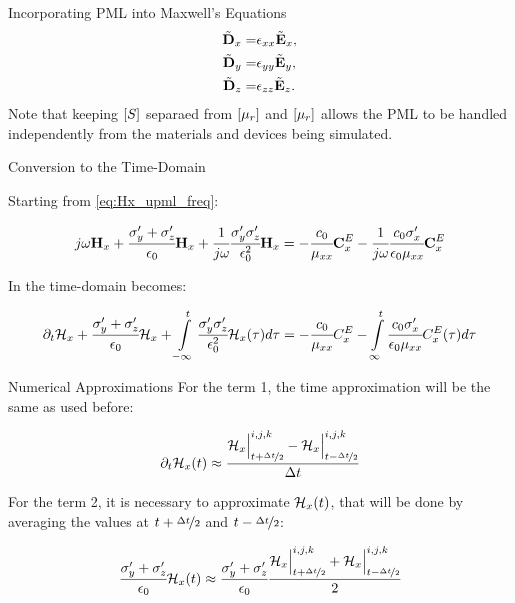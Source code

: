 \documentclass[aspectratio=169]{beamer}
\begin{document}
\begin{frame}{Incorporating PML into Maxwell's Equations}
  \begin{align}
    \tilde{\textbf{D}}_x =& \epsilon_{xx} \tilde{\textbf{E}}_x, \\
    \tilde{\textbf{D}}_y =& \epsilon_{yy} \tilde{\textbf{E}}_y, \\
    \tilde{\textbf{D}}_z =& \epsilon_{zz} \tilde{\textbf{E}}_z. 
  \end{align}
  Note that keeping $\brackets{S}$ separaed from $\brackets{\mu_r}$ and $\brackets{\mu_r}$ allows the PML to be handled independently from the materials and devices being simulated.
\end{frame}


\begin{frame}{Conversion to the Time-Domain}

  
  Starting from \eqref{eq:Hx_upml_freq}:


  \begin{align}
    j\omega \textbf{H}_x + \cfrac{\sigma_y^{\prime} + \sigma_z^{\prime}}{\epsilon_0}\textbf{H}_x + \cfrac{1}{j\omega}\cfrac{\sigma_y^{\prime}\sigma_z^{\prime}}{\epsilon_0^2}\textbf{H}_x
    = -\cfrac{c_0}{\mu_{xx}}\textbf{C}_x^E - \cfrac{1}{j\omega}\cfrac{c_0\sigma_x^{\prime}}{\epsilon_0\mu_{xx}}\textbf{C}_x^E
  \end{align}

  In the time-domain becomes:

  \begin{align}
    \partial_t\mathcal{H}_x + \cfrac{\sigma_y^{\prime} + \sigma_z^{\prime}}{\epsilon_0}\mathcal{H}_x + \int\limits_{-\infty}^t\cfrac{\sigma_y^{\prime}\sigma_z^{\prime}}{\epsilon_0^2}\mathcal{H}_x(\tau)d\tau
    = -\cfrac{c_0}{\mu_{xx}}C_x^E - \int\limits_{\infty}^t\cfrac{c_0\sigma_x^{\prime}}{\epsilon_0\mu_{xx}}C_x^E(\tau)d\tau
    \label{eq:Hx_upml_time}
  \end{align}

\end{frame}

\begin{frame}{Numerical Approximations}
  For the term 1, the time approximation will be the same as used before:

\begin{align}
    \partial_t\mathcal{H}_x(t) \approx \cfrac{\mathcal{H}_x\Big|_{t+\nicefrac{\Delta t}{2}}^{i,j,k}-\mathcal{H}_x\Big|^{i,j,k}_{t-\nicefrac{\Delta t}{2}}}{\Delta t}
\end{align}

For the term 2, it is necessary to approximate $\mathcal{H}_x(t)$, that will be done by averaging the values at $t + \nicefrac{\Delta t}{2}$ and $t - \nicefrac{\Delta t}{2}$:

\begin{align}
    \cfrac{\sigma_y^{\prime} + \sigma_z^{\prime}}{\epsilon_0}\mathcal{H}_x(t)\approx
    \cfrac{\sigma_y^{\prime} + \sigma_z^{\prime}}{\epsilon_0}\cfrac{\mathcal{H}_x\Big|_{t+\nicefrac{\Delta t}{2}}^{i,j,k}+\mathcal{H}_x\Big|^{i,j,k}_{t-\nicefrac{\Delta t}{2}}}{2}
\end{align}
\end{frame}
\end{document}
